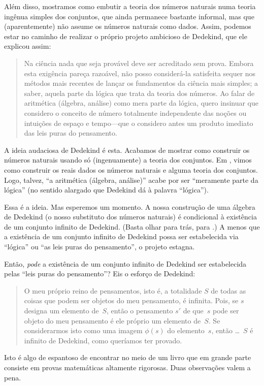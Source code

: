 \documentclass[../../../include/open-logic-section]{subfiles}
\begin{document}
Além disso, mostramos como embutir a teoria dos números naturais
numa teoria ingênua simples dos conjuntos, que ainda permanece bastante
informal, mas que (aparentemente) não assume os números naturais como dados.
Assim, podemos estar no caminho de realizar o próprio projeto ambicioso de Dedekind,
que ele explicou assim:
\begin{quote}
	Na ciência nada que seja provável deve ser acreditado sem
	prova. Embora esta exigência pareça razoável, não posso considerá-la
	satisfeita sequer nos métodos mais recentes de lançar os fundamentos
	da ciência mais simples; a saber, aquela parte da lógica que trata
	da teoria dos números. Ao falar de aritmética (álgebra, análise) como
	mera parte da lógica, quero insinuar que considero o conceito de número
	totalmente independente das noções ou intuições de espaço e tempo---que
	o considero antes um produto imediato das leis puras do pensamento.
	\citep[preface]{Dedekind1888}
\end{quote}
A ideia audaciosa de Dedekind é esta. Acabamos de mostrar como construir os
números naturais usando só (ingenuamente) a teoria dos conjuntos. Em
, vimos como construir os reais dados
os números naturais e alguma teoria dos conjuntos. Logo, talvez, ``a aritmética
(álgebra, análise)'' acabe por ser ``meramente parte da lógica'' (no
sentido alargado que Dedekind dá à palavra ``lógica'').

Essa é a ideia. Mas esperemos um momento. A nossa construção de uma
álgebra de Dedekind (o nosso substituto dos números naturais) é
condicional à existência de um conjunto infinito de Dedekind. (Basta olhar
para trás, para .)
A menos que a existência de um conjunto infinito de Dedekind possa ser estabelecida via
``lógica'' ou ``as leis puras do pensamento'', o projeto estagna.

Então, \emph{pode} a existência de um conjunto infinito de Dedekind ser estabelecida
pelas ``leis puras do pensamento''? Eis o esforço de Dedekind:
\begin{quote}
  O meu próprio reino de pensamentos, isto é, a totalidade $S$ de todas as coisas que
  podem ser objetos do meu pensamento, é infinita. Pois, se $s$ designa um
  elemento de~$S$, então o pensamento $s'$ de que~$s$ pode ser objeto do
  meu pensamento é ele próprio um elemento de~$S$. Se considerarmos isto como uma
  imagem $\phi(s)$ do elemento~$s$, então \dots~$S$ é infinito de Dedekind,
  como queríamos ter provado.
	\citep[\S66]{Dedekind1888}
\end{quote}
Isto é algo de espantoso de encontrar no meio de um livro
que em grande parte consiste em provas matemáticas altamente rigorosas. Duas
observações valem a pena.
\end{document}
